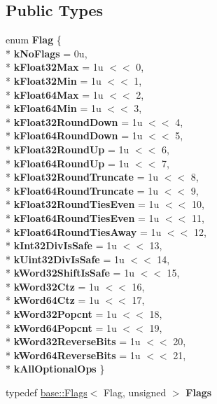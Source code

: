 \subsection*{Public Types}
\begin{DoxyCompactItemize}
\item 
enum {\bfseries Flag} \{ \\*
{\bfseries k\+No\+Flags} = 0u, 
\\*
{\bfseries k\+Float32\+Max} = 1u $<$$<$ 0, 
\\*
{\bfseries k\+Float32\+Min} = 1u $<$$<$ 1, 
\\*
{\bfseries k\+Float64\+Max} = 1u $<$$<$ 2, 
\\*
{\bfseries k\+Float64\+Min} = 1u $<$$<$ 3, 
\\*
{\bfseries k\+Float32\+Round\+Down} = 1u $<$$<$ 4, 
\\*
{\bfseries k\+Float64\+Round\+Down} = 1u $<$$<$ 5, 
\\*
{\bfseries k\+Float32\+Round\+Up} = 1u $<$$<$ 6, 
\\*
{\bfseries k\+Float64\+Round\+Up} = 1u $<$$<$ 7, 
\\*
{\bfseries k\+Float32\+Round\+Truncate} = 1u $<$$<$ 8, 
\\*
{\bfseries k\+Float64\+Round\+Truncate} = 1u $<$$<$ 9, 
\\*
{\bfseries k\+Float32\+Round\+Ties\+Even} = 1u $<$$<$ 10, 
\\*
{\bfseries k\+Float64\+Round\+Ties\+Even} = 1u $<$$<$ 11, 
\\*
{\bfseries k\+Float64\+Round\+Ties\+Away} = 1u $<$$<$ 12, 
\\*
{\bfseries k\+Int32\+Div\+Is\+Safe} = 1u $<$$<$ 13, 
\\*
{\bfseries k\+Uint32\+Div\+Is\+Safe} = 1u $<$$<$ 14, 
\\*
{\bfseries k\+Word32\+Shift\+Is\+Safe} = 1u $<$$<$ 15, 
\\*
{\bfseries k\+Word32\+Ctz} = 1u $<$$<$ 16, 
\\*
{\bfseries k\+Word64\+Ctz} = 1u $<$$<$ 17, 
\\*
{\bfseries k\+Word32\+Popcnt} = 1u $<$$<$ 18, 
\\*
{\bfseries k\+Word64\+Popcnt} = 1u $<$$<$ 19, 
\\*
{\bfseries k\+Word32\+Reverse\+Bits} = 1u $<$$<$ 20, 
\\*
{\bfseries k\+Word64\+Reverse\+Bits} = 1u $<$$<$ 21, 
\\*
{\bfseries k\+All\+Optional\+Ops}
 \}\hypertarget{classv8_1_1internal_1_1compiler_1_1_machine_operator_builder_a060ff782ffc93bfcf1bf39506c3ef835}{}\label{classv8_1_1internal_1_1compiler_1_1_machine_operator_builder_a060ff782ffc93bfcf1bf39506c3ef835}

\item 
typedef \hyperlink{classv8_1_1base_1_1_flags}{base\+::\+Flags}$<$ Flag, unsigned $>$ {\bfseries Flags}\hypertarget{classv8_1_1internal_1_1compiler_1_1_machine_operator_builder_aaa2c15070c17a7bb8bb646ed2a9112fa}{}\label{classv8_1_1internal_1_1compiler_1_1_machine_operator_builder_aaa2c15070c17a7bb8bb646ed2a9112fa}

\end{DoxyCompactItemize}
